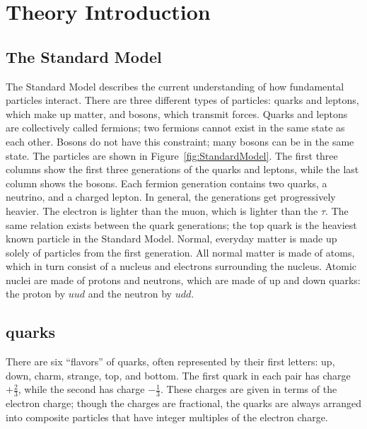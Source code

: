 \chapter{Theory Introduction}  %
\label{theory}

\section{The Standard Model}
\label{theory:SM}




The Standard Model describes the current understanding 
of how fundamental particles interact.  
There are three different types of particles: 
quarks and leptons, 
which make up matter, 
and bosons, which transmit forces.  
Quarks and leptons are collectively called fermions; 
two fermions cannot exist in the same state as each other.  
Bosons do not have this constraint; 
many bosons can be in the same state.  
The particles are shown in Figure~\ref{fig:StandardModel}. 
The first three columns show the first three generations 
of the quarks and leptons, 
while the last column shows the bosons.  
Each fermion generation contains two quarks, 
a neutrino, and a charged lepton.  
In general, the generations get progressively heavier.  
The electron is lighter than the muon, 
which is lighter than the $\tau$.   
The same relation exists between the quark generations; 
the top quark is the heaviest known particle in the Standard Model.  %
Normal, everyday matter is made up solely of particles 
from the first generation.  
All normal matter is made of atoms, 
which in turn consist of a nucleus and 
electrons surrounding the nucleus.  
Atomic nuclei are made of protons and neutrons, 
which are made of up and down quarks: 
the proton by $uud$ and the neutron by $udd$.  

\section{quarks}
There are six ``flavors'' of quarks, 
often represented by their first letters: 
up, down, charm, strange, top, and bottom.  
The first quark in each pair has charge $+\frac{2}{3}$, 
while the second has charge $-\frac{1}{3}$.  
These charges are given in terms of the electron charge; 
though the charges are fractional, 
the quarks are always arranged into composite 
particles that have integer multiples of the electron charge.  

